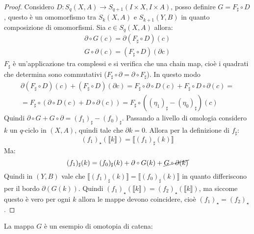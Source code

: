 \begin{proof}
  Considero $ D \colon S_q(X,A) \to S_{q+1}(I \times X, I \times A) $, posso definire
  $ G = F_\sharp \circ D $, questo è un omomorfismo tra $ S_k(X,A) $ e
  $ S_{k+1}(Y,B) $ in quanto composizione di omomorfismi.
  Sia $ c \in S_q(X,A) $ allora:
  \begin{gather*}
    \partial \circ G (c) = \partial (F_\sharp \circ D)(c) \\
    G \circ \partial (c) = (F_\sharp \circ D)(\partial c)
  \end{gather*}
  $ F_\sharp $ è un'applicazione tra complessi e si verifica che una chain map, cioè
  i quadrati che determina sono commutativi ($ F_\sharp \circ \partial = \partial \circ F_\sharp $). In questo modo
  \begin{gather*}
    \partial (F_\sharp \circ D)(c) + (F_\sharp \circ D)(\partial c) = F_\sharp \circ \partial \circ D (c) + F_\sharp \circ D \circ \partial (c) = \\
    = F_\sharp \circ ( \partial \circ D (c) + D \circ \partial (c)) = F_\sharp \circ ( (\eta_1)_\sharp - (\eta_0)_\sharp) (c)
  \end{gather*}
  Quindi $ \partial \circ G + G \circ \partial = (f_1)_\sharp - (f_0)_\sharp $.
  Passando a livello di omologia considero $ k $ un $ q $-ciclo in $ (X,A) $, quindi
  tale che $ \partial k = 0 $. Allora per la definizione di $ f_\sharp $:
  \[
    (f_1)_\star(\llbracket k \rrbracket) = \llbracket(f_1)_\sharp(k)\rrbracket
  \]
  Ma:
  \[
    (f_1)_\sharp(k) = (f_0)_\sharp (k) + \partial \circ G (k) + \cancel{G \circ \partial (k)}
  \]
  Quindi in $ (Y,B) $ vale che
  $ \llbracket(f_1)_\sharp(k)\rrbracket = \llbracket(f_0)_\sharp(k)\rrbracket $ in quanto differiscono per il bordo
  $ \partial(G(k)) $. Quindi
  $ (f_1)_\star(\llbracket k \rrbracket) = (f_2)_\star(\llbracket k \rrbracket) $, ma siccome questo è vero per ogni
  $ k $ allora le mappe devono coincidere, cioè $ (f_1)_\star = (f_2)_\star $.
\end{proof}
\eproof
La mappa $ G $ è un esempio di omotopia di catena:

